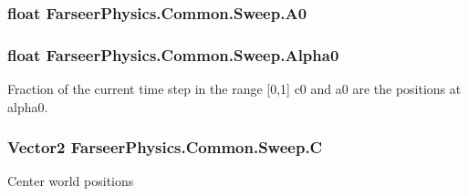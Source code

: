 \hypertarget{struct_farseer_physics_1_1_common_1_1_sweep_a8ef1361d8782e8334bb9a59b2db99130}{
\subsubsection[{A0}]{\setlength{\rightskip}{0pt plus 5cm}float Farseer\+Physics.\+Common.\+Sweep.\+A0}}\label{struct_farseer_physics_1_1_common_1_1_sweep_a8ef1361d8782e8334bb9a59b2db99130}
\hypertarget{struct_farseer_physics_1_1_common_1_1_sweep_a979d09b917c1b7be76852cc5328fe009}{
\subsubsection[{Alpha0}]{\setlength{\rightskip}{0pt plus 5cm}float Farseer\+Physics.\+Common.\+Sweep.\+Alpha0}}\label{struct_farseer_physics_1_1_common_1_1_sweep_a979d09b917c1b7be76852cc5328fe009}


Fraction of the current time step in the range \mbox{[}0,1\mbox{]} c0 and a0 are the positions at alpha0. 

\hypertarget{struct_farseer_physics_1_1_common_1_1_sweep_a7caadbea6902042f9101cbd9801be4f6}{
\subsubsection[{C}]{\setlength{\rightskip}{0pt plus 5cm}Vector2 Farseer\+Physics.\+Common.\+Sweep.\+C}}\label{struct_farseer_physics_1_1_common_1_1_sweep_a7caadbea6902042f9101cbd9801be4f6}


Center world positions 

